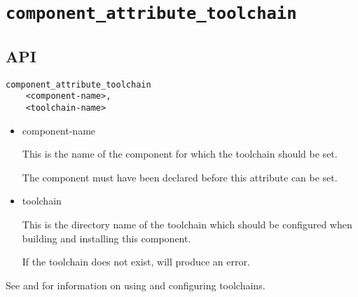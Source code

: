 \section{\texttt{component\_attribute\_toolchain}}\label{api:toolchain}

\subsection{API}

\begin{verbatim}
component_attribute_toolchain
    <component-name>,
    <toolchain-name>
\end{verbatim}

\begin{itemize}
\item component-name

  This is the name of the component for which the toolchain should be
  set.

  The component must have been declared before this attribute can be
  set.

\item toolchain

  This is the directory name of the toolchain which should be
  configured when building and installing this component.

  If the toolchain does not exist, \lmsbw will produce an
  error.
\end{itemize}

See  and
 for information on using and
configuring toolchains.

